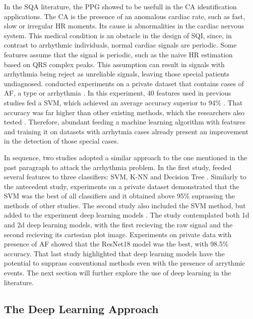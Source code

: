 In the \acrshort{SQA} literature, the \acrshort{PPG} showed to be usefull in the \acrlong{CA} identification applications. The \acrfull{CA} is the presence of an anomalous cardiac rate, such as fast, slow or irregular \acrshort{HR} moments. Its cause is abnormalities in the cardiac nervous system. This medical condition is an obstacle in the design of \acrshort{SQI}, since, in contrast to arrhythmic individuals, normal cardiac signals are periodic. Some features assume that the signal is periodic, such as the naive \acrshort{HR} estimation based on QRS complex peaks. This assumption can result in signals with arrhythmia being reject as unreliable signals, leaving those special patients undiagnosed. \citeauthor{review-5} conducted experiments on a private dataset that contains cases of \acrfull{AF}, a type or arrhythmia \cite{review-5}. In this experiment, 40 features used in previous studies fed a \acrshort{SVM}, which achieved an average accuracy superior to 94\% \cite{review-5}. That accuracy was far higher than other existing methods, which the researchers also tested \cite{review-5}. Therefore, abundant feeding a machine learning algorithm with features and training it on datasets with arrhytmia cases already present an improvement in the detection of those special cases.

In sequence, two studies adopted a similar approach to the one mentioned in the past paragraph to attack the arrhythmia problem. In the first study, \citeauthor{review-6} feeded several features to three classifiers: \acrshort{SVM}, \acrshort{K-NN} and Decision Tree \cite{review-6}. Similarly to the antecedent study, experiments on a private dataset demonstrated that the \acrshort{SVM} was the best of all classifiers and it obtained above 95\% suprassing the methods of other studies. The second study also included the \acrshort{SVM} method, but added to the experiment deep learning models \cite{review-7}. The study contemplated both 1d and 2d deep learning models, with the first recieving the raw signal and the second recieving its cartesian plot image. Experiments on private data with presence of \acrshort{AF} showed that the ResNet18 model was the best, with 98.5\% accuracy. That last study highlighted that deep learning models have the potential to supprass conventional methods even with the presence of arrythmic events. The next section will further explore the use of deep learning in the literature.  

\subsection{The Deep Learning Approach}
\label{sec:deep_learning}

